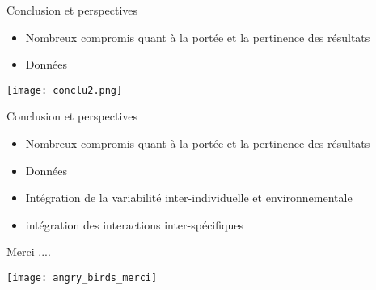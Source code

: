 \documentclass[]{beamer}
\begin{document}
\begin{frame}{Conclusion et perspectives}
\begin{itemize}
\item Nombreux compromis quant à la portée et la pertinence des résultats\\
\item Données
\end{itemize}
\begin{center}
 \texttt{[image: conclu2.png]}
\end{center}

\end{frame}

\begin{frame}{Conclusion et perspectives}
\begin{itemize}
\item Nombreux compromis quant à la portée et la pertinence des résultats\\
\item Données
\item Intégration de la variabilité inter-individuelle et environnementale
\item intégration des interactions inter-spécifiques
\end{itemize}
\end{frame}


 \begin{frame}[plain]
  \begin{center}
  \begin{huge}
   Merci ....
   
  \end{huge}

  \end{center}

  \texttt{[image: angry\_birds\_merci]}
 \end{frame}
 
 
 

 
\end{document}
